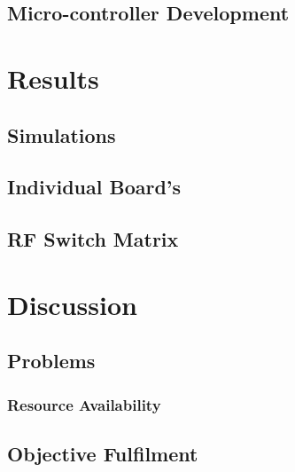 \documentclass[12pt,openany,a4paper]{book}
\begin{document}
\section{Micro-controller Development}











\chapter{Results}
\section{Simulations}


\section{Individual Board's}



\section{RF Switch Matrix}








\chapter{Discussion}
\section{Problems}

\subsection{Resource Availability}


\section{Objective Fulfilment}
\end{document}
